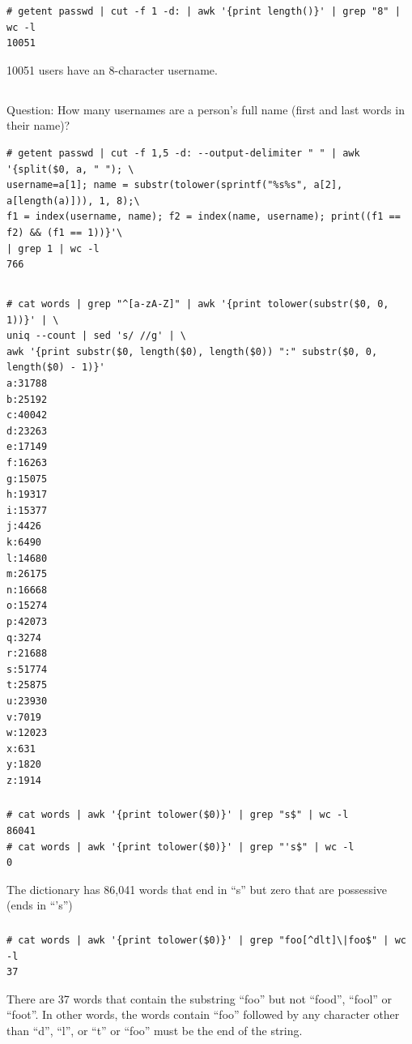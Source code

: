 \documentclass{article}
\begin{document}
\begin{verbatim}
# getent passwd | cut -f 1 -d: | awk '{print length()}' | grep "8" | wc -l
10051
\end{verbatim}
10051 users have an 8-character username.


\subsection{}
Question: How many usernames are a person's full name (first and last words in their name)?
\begin{verbatim}
# getent passwd | cut -f 1,5 -d: --output-delimiter " " | awk '{split($0, a, " "); \
username=a[1]; name = substr(tolower(sprintf("%s%s", a[2], a[length(a)])), 1, 8);\
f1 = index(username, name); f2 = index(name, username); print((f1 == f2) && (f1 == 1))}'\
| grep 1 | wc -l
766
\end{verbatim}



\subsection{}
\subsubsection{}
\begin{verbatim}
# cat words | grep "^[a-zA-Z]" | awk '{print tolower(substr($0, 0, 1))}' | \
uniq --count | sed 's/ //g' | \
awk '{print substr($0, length($0), length($0)) ":" substr($0, 0, length($0) - 1)}'
a:31788
b:25192
c:40042
d:23263
e:17149
f:16263
g:15075
h:19317
i:15377
j:4426
k:6490
l:14680
m:26175
n:16668
o:15274
p:42073
q:3274
r:21688
s:51774
t:25875
u:23930
v:7019
w:12023
x:631
y:1820
z:1914
\end{verbatim}


\subsubsection{}
\begin{verbatim}
# cat words | awk '{print tolower($0)}' | grep "s$" | wc -l
86041
# cat words | awk '{print tolower($0)}' | grep "'s$" | wc -l
0
\end{verbatim}
The dictionary has 86,041 words that end in ``s'' but zero that are possessive (ends in ``'s'')

\subsubsection{}
\begin{verbatim}
# cat words | awk '{print tolower($0)}' | grep "foo[^dlt]\|foo$" | wc -l
37
\end{verbatim}
There are 37 words that contain the substring ``foo'' but not ``food'', ``fool'' or ``foot''. In other words,
the words contain ``foo'' followed by any character other than ``d'', ``l'', or ``t'' or ``foo'' must be the end of the string.
\end{document}
